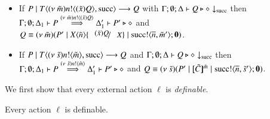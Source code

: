 \begin{definition}[Definibility]
\begin{itemize}
		\item	If $P \;|\; T\langle (\nu\ \tilde{m})n ! \langle (\tilde{x})Q \rangle, \textrm{succ} \rangle \longrightarrow Q$
			with $\Gamma; \emptyset; \Delta \vdash Q \triangleright \diamond \downarrow_{\textrm{succ}}$ then
			$\Gamma; \emptyset; \Delta_1 \vdash P \stackrel{(\nu\ \tilde{m})n ! \langle (\tilde{x})Q \rangle}{\Longrightarrow} \Delta_1' \vdash P' \triangleright \diamond$
			and $Q \scong \newsp{\tilde{m}}{P' \Par \appl{X}{\tilde{n}} \subst{(\tilde{x}) Q}{X} \Par \bout{\suc}{\dual{n}, \tilde{m}'} \inact}$.

		\item	If $P \;|\; T\langle (\nu\ \tilde{s})n ! \langle \tilde{m} \rangle, \textrm{succ} \rangle \longrightarrow Q $
			and $\Gamma; \emptyset; \Delta \vdash Q \triangleright \diamond \downarrow_{\textrm{succ}}$ then
			$\Gamma; \emptyset; \Delta_1 \vdash P \stackrel{(\nu\ \tilde{s})n ! \langle \tilde{m} \rangle}{\Longrightarrow} \Delta_1' \vdash P' \triangleright \diamond$
			and $Q \equiv (\nu\ \tilde{s})(P' \;|\; [\!\![\tilde{C}]\!\!]^{\tilde{m}} \;|\; \textrm{succ} ! \langle \overline{n}, \tilde{s}' \rangle ; \mathbf{0})$.


	\end{itemize}	
%
\end{definition}

We first show that every external action $\ell$ is {\em definable}.

\begin{lemma}[Definibility]
	\label{lem:definibility}
	Every action $\ell$ is definable.
\end{lemma}

